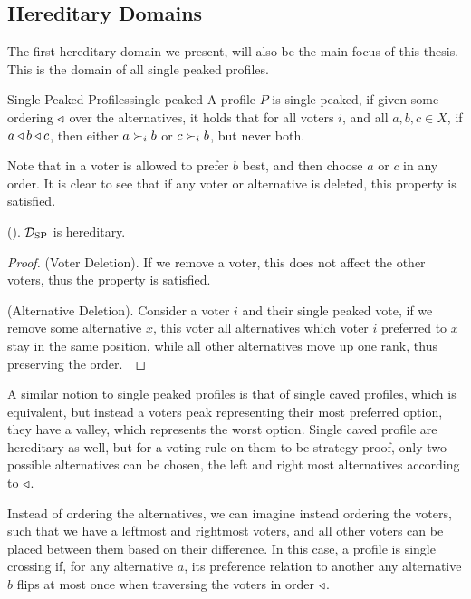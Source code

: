 \subsection{Hereditary Domains}

The first hereditary domain we present, will also be the main focus of this thesis. This is the domain of all single peaked profiles. 

\begin{definition}{Single Peaked Profiles}{single-peaked}
	A profile $P$ is single peaked, if given some ordering $\triangleleft$ over the alternatives, it holds that for all voters $i$, and all $a, b, c \in X$, if $a \triangleleft b \triangleleft c$, then either $a \succ_i b$ or $c \succ_i b$, but never both.
\end{definition}

Note that in  a voter is allowed to prefer $b$ best, and then choose $a$ or $c$ in any order. It is clear to see that if any voter or alternative is deleted, this property is satisfied.

\begin{proposition}{\textnormal{(\citet{Elkind_Lackner_Peters_2022}).}}
	$\mathcal{D}_{\text{SP}}$ is hereditary.
\end{proposition}

\begin{proof}
	(Voter Deletion). If we remove a voter, this does not affect the other voters, thus the property is satisfied.~\checkmark	

	(Alternative Deletion). Consider a voter $i$ and their single peaked vote, if we remove some alternative $x$, this voter all alternatives which voter $i$ preferred to $x$ stay in the same position, while all other alternatives move up one rank, thus preserving the order.~\checkmark
\end{proof}

A similar notion to single peaked profiles is that of single caved profiles, which is equivalent, but instead a voters peak representing their most preferred option, they have a valley, which represents the worst option. Single caved profile are hereditary as well, but for a voting rule on them to be strategy proof, only two possible alternatives can be chosen, the left and right most alternatives according to $\triangleleft$.

Instead of ordering the alternatives, we can imagine instead ordering the voters, such that we have a leftmost and rightmost voters, and all other voters can be placed between them based on their difference. In this case, a profile is single crossing if, for any alternative $a$, its preference relation to another any alternative $b$ flips at most once when traversing the voters in order $\triangleleft$.

